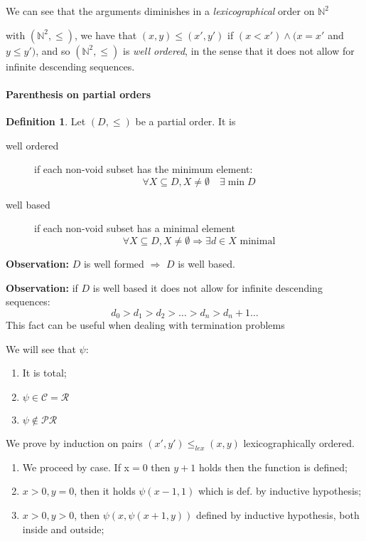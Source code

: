 \documentclass{amsbook}
\theoremstyle{definition}
\newtheorem{definition}[theorem]{Definition}
\theoremstyle{remark}
\numberwithin{section}{chapter}
\numberwithin{equation}{chapter}
\begin{document}
We can see that the arguments diminishes in a \emph{lexicographical}
order on $\mathbb{N}^2$

with $(\mathbb{N}^2, \leq )$, we have that $(x,y) \leq (x', y')$ if
$(x < x') \wedge (x=x'$ and $y \leq y')$, and so $( \mathbb{N}^2, \leq )$
is \emph{well ordered}, in the sense that it does not allow for
infinite descending sequences.

\paragraph{Parenthesis on partial orders}
\begin{definition}
  Let $(D, \leq)$ be a partial order. It is
  \begin{description}
  \item[well ordered] if each non-void subset has the minimum element:
    $$\forall X \subseteq D, X \neq \emptyset \quad \exists \min D$$
  \item[well based] if each non-void subset has a minimal element
    $$ \forall X \subseteq D, X \neq \emptyset \Rightarrow \exists d \in X \text{ minimal}$$
  \end{description}
\end{definition}

\textbf{Observation:} $D$ is well formed $\Rightarrow$ $D$ is well based.

\textbf{Observation:} if $D$ is well based it does not allow for
infinite descending sequences:
\[
  d_0 > d_1 > d_2 > \dots > d_n > d_n+1 \dots
\]
This fact can be useful when dealing with termination problems


We will see that $ \psi $:
\begin{enumerate}
	\item It is total;
	\item $ \psi \in \mathcal{C} = \mathcal{R} $
	\item $ \psi \not \in \mathcal{PR} $
\end{enumerate}

We prove by induction on pairs $ (x',y') \leq_{lex} (x,y) $ lexicographically ordered.

\begin{enumerate}
	\item We proceed by case. If x$ = 0$ then $y + 1$ holds then the function is defined;
	\item $ x>0, y=0 $, then it holds $ \psi(x-1,1) $ which is def. by inductive hypothesis;
	\item $ x>0, y>0 $, then $ \psi(x, \psi(x+1, y)) $ defined by inductive hypothesis, both inside and outside;
\end{enumerate}
\end{document}
